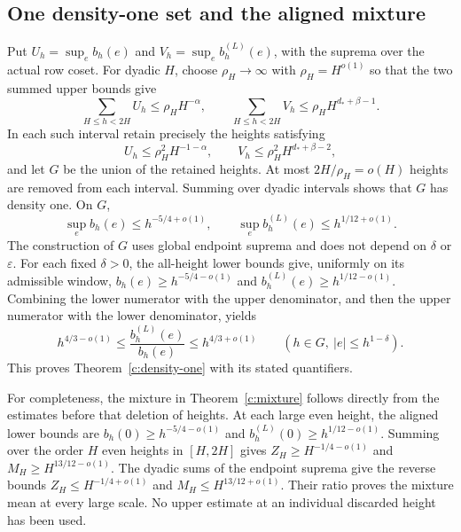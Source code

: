\subsection{One density-one set and the aligned mixture}
Put $U_h=\sup_e b_h(e)$ and $V_h=\sup_e b_h^{(L)}(e)$, with the
suprema over the actual row coset. For dyadic $H$, choose
$\rho_H\to\infty$ with $\rho_H=H^{o(1)}$ so that the two summed
upper bounds give
\[
 \sum_{H\le h<2H}U_h\le\rho_H H^{-\alpha},\qquad
 \sum_{H\le h<2H}V_h\le\rho_H H^{d_*+\beta-1}.
\]
In each such interval retain precisely the heights satisfying
\[
 U_h\le\rho_H^2 H^{-1-\alpha},\qquad
 V_h\le\rho_H^2 H^{d_*+\beta-2},
\]
and let $G$ be the union of the retained heights. At most
$2H/\rho_H=o(H)$ heights are removed from each interval. Summing
over dyadic intervals shows that $G$ has density one. On $G$,
\[
 \sup_e b_h(e)\le h^{-5/4+o(1)},\qquad
 \sup_e b_h^{(L)}(e)\le h^{1/12+o(1)}.
\]
The construction of $G$ uses global endpoint suprema and does not
depend on $\delta$ or $\varepsilon$. For each fixed $\delta>0$, the
all-height lower bounds give, uniformly on its admissible window,
$b_h(e)\ge h^{-5/4-o(1)}$ and
$b_h^{(L)}(e)\ge h^{1/12-o(1)}$. Combining the lower numerator with
the upper denominator, and then the upper numerator with the lower
denominator, yields
\[
 h^{4/3-o(1)}\le\frac{b_h^{(L)}(e)}{b_h(e)}
 \le h^{4/3+o(1)}\qquad(h\in G,\ |e|\le h^{1-\delta}).
\]
This proves Theorem~\ref{c:density-one} with its stated quantifiers.

For completeness, the mixture in Theorem~\ref{c:mixture} follows directly from the estimates before that deletion of heights. At each large even height, the aligned lower bounds are $b_h(0)\ge h^{-5/4-o(1)}$ and $b_h^{(L)}(0)\ge h^{1/12-o(1)}$. Summing over the order $H$ even heights in $[H,2H]$ gives $Z_H\ge H^{-1/4-o(1)}$ and $M_H\ge H^{13/12-o(1)}$. The dyadic sums of the endpoint suprema give the reverse bounds $Z_H\le H^{-1/4+o(1)}$ and $M_H\le H^{13/12+o(1)}$. Their ratio proves the mixture mean at every large scale. No upper estimate at an individual discarded height has been used.
